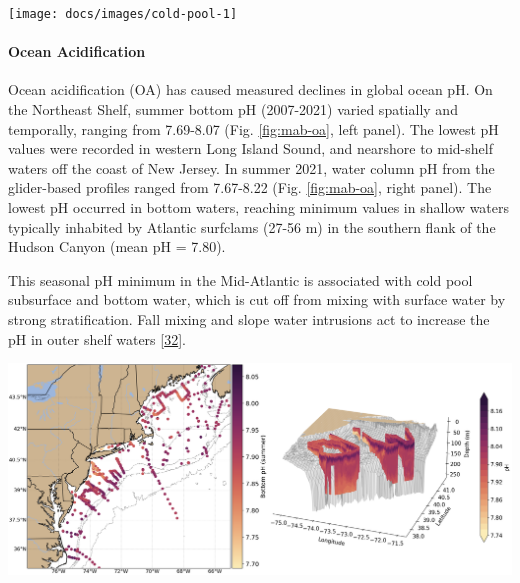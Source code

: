 \documentclass[
  10pt,
]{article}
\let\origfigure\figure
\let\endorigfigure\endfigure
\renewenvironment{figure}[1][2] {
    \expandafter\origfigure\expandafter[H]
} {
    \endorigfigure
}
\begin{document}
\begin{figure}

{\centering \texttt{[image: docs/images/cold-pool-1]} 

}

\caption{Seasonal cold pool indices: mean temperature within the cold pool, cold pool persistence, and spatial extent.}\label{fig:cold-pool}
\end{figure}

\hypertarget{ocean-acidification}{%
\paragraph{Ocean Acidification}\label{ocean-acidification}}

Ocean acidification (OA) has caused measured declines in global ocean
pH. On the Northeast Shelf, summer bottom pH (2007-2021) varied
spatially and temporally, ranging from 7.69-8.07 (Fig. \ref{fig:mab-oa},
left panel). The lowest pH values were recorded in western Long Island
Sound, and nearshore to mid-shelf waters off the coast of New Jersey. In
summer 2021, water column pH from the glider-based profiles ranged from
7.67-8.22 (Fig. \ref{fig:mab-oa}, right panel). The lowest pH occurred
in bottom waters, reaching minimum values in shallow waters typically
inhabited by Atlantic surfclams (27-56 m) in the southern flank of the
Hudson Canyon (mean pH = 7.80).

This seasonal pH minimum in the Mid-Atlantic is associated with cold
pool subsurface and bottom water, which is cut off from mixing with
surface water by strong stratification. Fall mixing and slope water
intrusions act to increase the pH in outer shelf waters
{[}\protect\hyperlink{ref-wrightfairbanks_autonomous_2020}{32}{]}.

\begin{figure}

{\centering \includegraphics[width=0.8\linewidth]{images/Saba_Fig_SOE_MAFMC - Grace Saba} 

}

\caption{Left: Summer bottom pH collated from all quality-controlled vessel- and glider-based measurements from 2007-2021. Right: Glider-based pH profiles collected during summer 2021 in the Mid-Atlantic.}\label{fig:mab-oa}
\end{figure}
\end{document}
